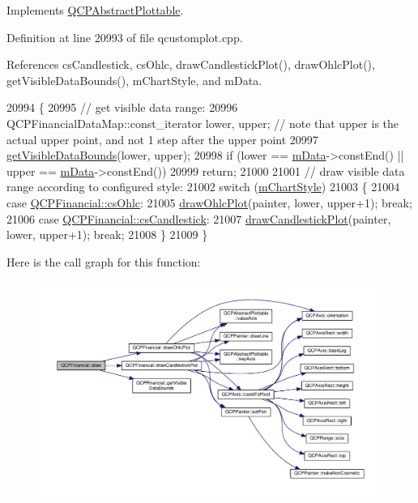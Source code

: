 Implements \hyperlink{class_q_c_p_abstract_plottable_acbab5e30dcd04fd302b4a5902ac2c482}{Q\+C\+P\+Abstract\+Plottable}.



Definition at line 20993 of file qcustomplot.\+cpp.



References cs\+Candlestick, cs\+Ohlc, draw\+Candlestick\+Plot(), draw\+Ohlc\+Plot(), get\+Visible\+Data\+Bounds(), m\+Chart\+Style, and m\+Data.


\begin{DoxyCode}
20994 \{
20995   \textcolor{comment}{// get visible data range:}
20996   QCPFinancialDataMap::const\_iterator lower, upper; \textcolor{comment}{// note that upper is the actual upper point, and not 1
       step after the upper point}
20997   \hyperlink{class_q_c_p_financial_aca2edf9f19fae733cdb6bd4549019b84}{getVisibleDataBounds}(lower, upper);
20998   \textcolor{keywordflow}{if} (lower == \hyperlink{class_q_c_p_financial_a475f63587ca1077d8c30aaf2b71ae026}{mData}->constEnd() || upper == \hyperlink{class_q_c_p_financial_a475f63587ca1077d8c30aaf2b71ae026}{mData}->constEnd())
20999     \textcolor{keywordflow}{return};
21000   
21001   \textcolor{comment}{// draw visible data range according to configured style:}
21002   \textcolor{keywordflow}{switch} (\hyperlink{class_q_c_p_financial_ab65c2ce8d6354451870bb44b894c1e92}{mChartStyle})
21003   \{
21004     \textcolor{keywordflow}{case} \hyperlink{class_q_c_p_financial_a0f800e21ee98d646dfc6f8f89d10ebfba3a516016c9298d3e95dd82aa203c4390}{QCPFinancial::csOhlc}:
21005       \hyperlink{class_q_c_p_financial_a3c3007a7434e29d042c77ccf4f497e66}{drawOhlcPlot}(painter, lower, upper+1); \textcolor{keywordflow}{break};
21006     \textcolor{keywordflow}{case} \hyperlink{class_q_c_p_financial_a0f800e21ee98d646dfc6f8f89d10ebfbac803cbd39f26e3f206bcc7028679e62f}{QCPFinancial::csCandlestick}:
21007       \hyperlink{class_q_c_p_financial_a71f5081da0e5ab9c40a488ad40cff122}{drawCandlestickPlot}(painter, lower, upper+1); \textcolor{keywordflow}{break};
21008   \}
21009 \}
\end{DoxyCode}


Here is the call graph for this function\+:\nopagebreak
\begin{figure}[H]
\begin{center}
\leavevmode
\includegraphics[width=350pt]{class_q_c_p_financial_ad71a59a1b42616594831e04e52c92120_cgraph}
\end{center}
\end{figure}


